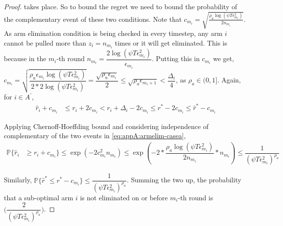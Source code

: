 \begin{proof}
	takes place. So to bound the regret we need to bound the probability of the complementary event of these two conditions. Note that  $c_{m_{i}} = \sqrt{\frac{\rho_{a}\log (\psi T\epsilon_{m_{i}}^{2})}{2 n_{m_i}}}$. As arm elimination condition is being checked in every timestep, any arm $i$ cannot be pulled more than $z_i= n_{m_i}$ times or it will get eliminated. This is because in the $m_i$-th round $n_{m_{i}}=\dfrac{2\log{(\psi T\epsilon_{m_{i}}^{2})}}{\epsilon_{m_{i}}}$. Putting this in $c_{m_i}$ we get,
  $c_{m_i}=\sqrt{\dfrac{\rho_{a}\epsilon_{m_{i}}\log (\psi T\epsilon_{m_{i}}^{2})}{2*2 \log(\psi T\epsilon_{m_{i}}^{2})}}=\dfrac{\sqrt{\rho_{a}\epsilon_{m_{i}}}}{2} \leq  \sqrt{\rho_{a}\epsilon_{m_{i}+1}} < \dfrac{\Delta_{i}}{4} $, as $\rho_{a}\in (0,1]$.
  Again, for ${i} \in A^{'}$, 
  \begin{align*}
\hat{r}_{i} + c_{m_i}&\leq r_{i} + 2c_{m_i} 
 < r_{i} + \Delta_{i} - 2c_{m_i}
 \leq r^{*} -2c_{m_i} 
 \leq \hat{r}^{*} - c_{m_i}
  \end{align*}

	Applying Chernoff-Hoeffding bound and considering independence of complementary of the two events in \ref{eq:appA:armelim-casea},
  \begin{align*}
\mathbb{P}\lbrace\hat{r}_{i}&\geq r_{i} + c_{m_i}\rbrace\leq \exp(-2c_{m_i}^{2}n_{m_{i}})
\leq \exp(-2 * \dfrac{\rho_{a}\log (\psi T\epsilon_{m_{i}}^{2})}{2 n_{m_{i}}} *n_{m_{i}})
\leq \dfrac{1}{(\psi T\epsilon_{m_{i}}^{2})^{\rho_{a}}}   
  \end{align*}
 
 
Similarly, $\mathbb{P}\lbrace\hat{r}^{*}\leq r^{*} - c_{m_i}\rbrace\leq \dfrac{1}{(\psi  T\epsilon_{m_{i}}^{2})^{\rho_{a}}}$. Summing the two up, the probability that a sub-optimal arm ${i}$ is not eliminated on or before $m_{i}$-th round is  $\bigg(\dfrac{2}{(\psi T\epsilon_{m_{i}}^{2})^{\rho_{a}}}\bigg)$. 
 

\end{proof}

